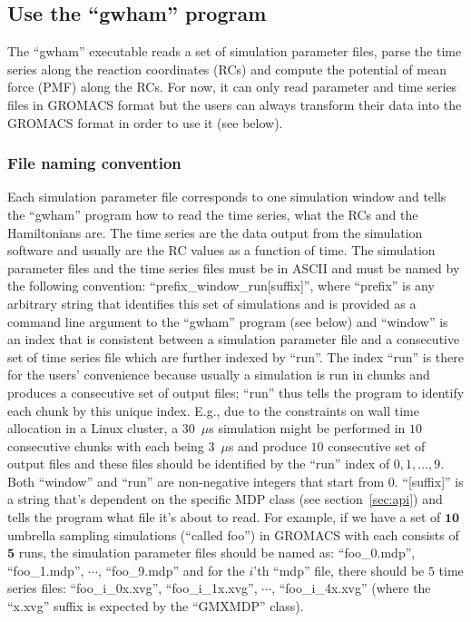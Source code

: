 \subsection{Use the ``gwham'' program}
The ``gwham'' executable reads a set of simulation parameter files, parse the
time series along the reaction coordinates (RCs) and compute the potential of
mean force (PMF) along the RCs. For now, it can only read parameter and 
time series files in GROMACS format but the users can always transform their 
data into the GROMACS format in order to use it (see below).

\subsubsection{File naming convention}\label{sec:fname}
Each simulation parameter file corresponds to one simulation window and tells
the ``gwham'' program how to read the time series, what the RCs and the
Hamiltonians are. The time series are the data output from the simulation
software and usually are the RC values as a function of time. The simulation
parameter files and the time series files must be in ASCII and must be named by
the following convention: ``prefix\_window\_run[suffix]'', where ``prefix'' is
any arbitrary string that identifies this set of simulations and is provided as
a command line argument to the ``gwham'' program (see below) and ``window'' is
an index that is consistent between a simulation parameter file and a
consecutive set of time series file which are further indexed by ``run''. The
index ``run'' is there for the users' convenience because usually a simulation
is run in chunks and produces a consecutive set of output files; ``run'' thus
tells the program to identify each chunk by this unique index. E.g., due to the
constraints on wall time allocation in a Linux cluster, a 30~$\mu$s simulation
might be performed in $10$ consecutive chunks with each being $3$~$\mu$s and
produce $10$ consecutive set of output files and these files should be
identified by the ``run'' index of $0,1,\dotsc,9$.  Both ``window'' and ``run''
are non-negative integers that start from 0. ``[suffix]'' is a string that's
dependent on the specific MDP class (see section~\ref{sec:api}) and tells the
program what file it's about to read.  For example, if we have a set of
$\mathbf{10}$ umbrella sampling simulations (``called foo'') in GROMACS with
each consists of $\mathbf{5}$ runs, the simulation parameter files should be
named as: ``foo\_0.mdp'', ``foo\_1.mdp'', $\cdots$, ``foo\_9.mdp'' and for the
$i$'th ``mdp'' file, there should be $5$ time series files: ``foo\_i\_0x.xvg'',
``foo\_i\_1x.xvg'', $\cdots$, ``foo\_i\_4x.xvg'' (where the ``x.xvg'' suffix is
expected by the ``GMXMDP'' class). 

